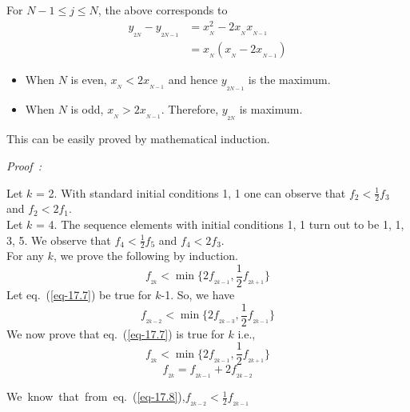 \begin{multicols}{2}
For\hspace{0.1in} $N-1 \leq j \leq N$,\hspace{0.1in} the above corresponds to
\begin{align}
y_{_{2N}} - y_{_{2N-1}} &= x_{_N}^2 - 2x_{_N}x_{_{N-1}}\label{eq-17.5}\\
&= x_{_N}(x_{_N} - 2x_{_{N-1}})\label{eq-17.6}
\end{align} 

\vspace{-.6cm}

\begin{itemize}
 \setlength{\parskip}{-1pt}
\item When $N$ is even, $x_{_N} < 2x_{_{N-1}}$ and hence $y_{_{2N-1}}$ is the maximum.\\[-.5cm]
\item When $N$ is odd, $x_{_N} > 2x_{_{N-1}}$. Therefore, $y_{_{2N}}$ is maximum.
\end{itemize}

\vspace{-.3cm}

This can be easily proved by mathematical induction.
 
{\it Proof~:}

Let $k$ = 2. With standard initial conditions 1, 1 one can observe that $f_2 < \frac{1}{2}f_3$ and $f_2 < 2f_1$.\\
Let $k$ = 4. The sequence elements with initial conditions 1, 1 turn out to be 1, 1, 3, 5. We observe that $f_4 < \frac{1}{2}f_5$ and $f_4 < 2f_3$. \\
For any $k$, we prove the following by induction. 
\begin{equation}
f_{_{2k}} < \min\{2f_{_{2k-1}}, \frac{1}{2}f_{_{2k+1}}\}\label{eq-17.7}
\end{equation}
Let eq.~(\ref{eq-17.7}) be true for $k$-1. So, we have
\begin{equation}
f_{_{2k-2}} < \min\{2f_{_{2k-3}}, \frac{1}{2}f_{_{2k-1}}\}\label{eq-17.8}
\end{equation}
We now prove that eq.~(\ref{eq-17.7}) is true for $k$ i.e.,
\begin{equation}\nonumber
f_{_{2k}} < \min\{2f_{_{2k-1}}, \frac{1}{2}f_{_{2k+1}}\}
\end{equation}
\begin{equation}
f_{_{2k}} = f_{_{2k-1}} + 2f_{_{2k-2}}\label{eq-17.9}
\end{equation}

\textup{We~know~that~from~eq.~(\ref{eq-17.8})},\quad $f_{_{2k-2}} < \frac{1}{2}f_{_{2k-1}}$ 


\end{multicols}
